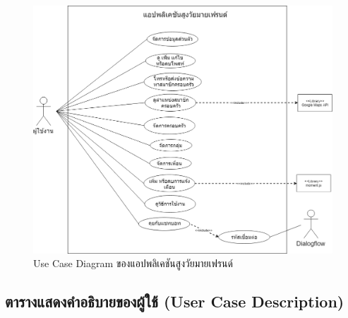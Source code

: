 	\begin{figure}[H]
		\includegraphics[width=1.1\textwidth]{Figures/3/Usecase/Usecase}
		\caption{Use Case Diagram ของแอปพลิเคชันสูงวัยมายเฟรนด์}
		\label{Fig:usecase}
	\end{figure}
	
	\subsection{ตารางแสดงคำอธิบายของผู้ใช้ (User Case Description)}

